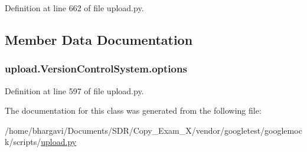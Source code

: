 Definition at line 662 of file upload.\+py.



\subsection{Member Data Documentation}
\subsubsection[{\texorpdfstring{options}{options}}]{\setlength{\rightskip}{0pt plus 5cm}upload.\+Version\+Control\+System.\+options}\hypertarget{classupload_1_1_version_control_system_a4d57d043bc408887b94269fe4cea9556}{}\label{classupload_1_1_version_control_system_a4d57d043bc408887b94269fe4cea9556}


Definition at line 597 of file upload.\+py.



The documentation for this class was generated from the following file\+:\begin{DoxyCompactItemize}
\item 
/home/bhargavi/\+Documents/\+S\+D\+R/\+Copy\+\_\+\+Exam\+\_\+X/vendor/googletest/googlemock/scripts/\hyperlink{googlemock_2scripts_2upload_8py}{upload.\+py}\end{DoxyCompactItemize}
